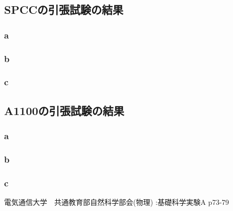 \documentclass[10pt,a4j]{jsarticle}
\begin{document}
  \subsection{SPCCの引張試験の結果}
    \subsubsection{a}
    \subsubsection{b}
    \subsubsection{c}
  \subsection{A1100の引張試験の結果}
    \subsubsection{a}
    \subsubsection{b}
    \subsubsection{c}
\begin{thebibliography}{3}
\bibitem{}電気通信大学　共通教育部自然科学部会(物理) :基礎科学実験A p73-79
\end{thebibliography}
\end{document}
